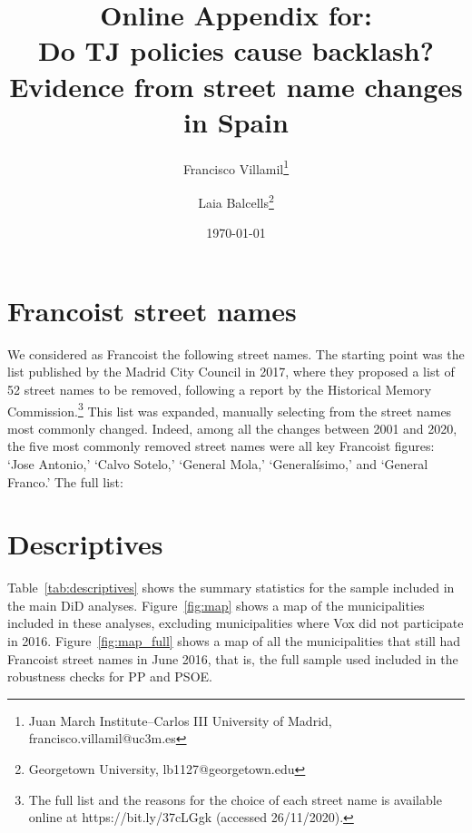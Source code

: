 \documentclass[12pt, titlepage]{article}
\title{\Large Online Appendix for:\\Do TJ policies cause backlash?\\Evidence from street name changes in Spain}
\author{Francisco Villamil\thanks{Juan March Institute--Carlos III University of Madrid, francisco.villamil@uc3m.es} \and Laia Balcells\thanks{Georgetown University, lb1127@georgetown.edu}}
\date{\today}
\begin{document}
\maketitle

\tableofcontents

\clearpage
\section{Francoist street names}\label{app:franc_names_list}

We considered as Francoist the following street names. The starting point was the list published by the Madrid City Council in 2017, where they proposed a list of 52 street names to be removed, following a report by the Historical Memory Commission.\footnote{The full list and the reasons for the choice of each street name is available online at https://bit.ly/37cLGgk (accessed 26/11/2020).}
This list was expanded, manually selecting from the street names most commonly changed.
Indeed, among all the changes between 2001 and 2020, the five most commonly removed street names were all key Francoist figures: `Jose Antonio,' `Calvo Sotelo,' `General Mola,' `Generalísimo,' and `General Franco.' The full list:

\begin{quote}
  
\end{quote}

\clearpage
\section{Descriptives}\label{app:descriptives}

Table~\ref{tab:descriptives} shows the summary statistics for the sample included in the main DiD analyses. Figure~\ref{fig:map} shows a map of the municipalities included in these analyses, excluding municipalities where Vox did not participate in 2016.
Figure~\ref{fig:map_full} shows a map of all the municipalities that still had Francoist street names in June 2016, that is, the full sample used included in the robustness checks for PP and PSOE.


\end{document}
